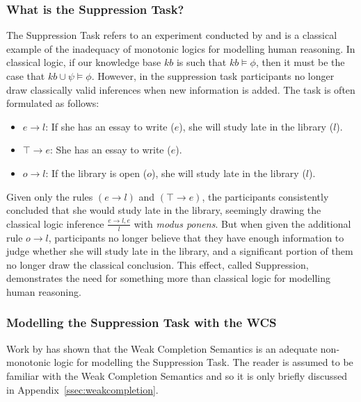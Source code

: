 \documentclass{article}
\begin{document}
\subsubsection{What is the Suppression Task?}
The Suppression Task refers to an experiment conducted by \cite{byrne1989suppressing} and is a classical example of the inadequacy of monotonic logics for modelling human reasoning. In classical logic, if our knowledge base $kb$ is such that $kb \models \phi$, then it must be the case that $kb \cup \psi \models \phi$. However, in the suppression task participants no longer draw classically valid inferences when new information is added. The task is often formulated as follows:

\begin{itemize}
\item $e \rightarrow l$: If she has an essay to write ($e$), she will study late in the library ($l$).
\item $\top \rightarrow e$: She has an essay to write ($e$).
\item $o\rightarrow l$: If the library is open ($o$), she will study late in the library ($l$).
\end{itemize}

Given only the rules $(e \rightarrow l)$ and $(\top \rightarrow e)$, the participants consistently concluded that she would study late in the library, seemingly drawing the classical logic inference $\frac{e \rightarrow l, e}{l}$ with \textit{modus ponens}. But when given the additional rule $o\rightarrow l$, participants no longer believe that they have enough information to judge whether she will study late in the library, and a significant portion of them no longer draw the classical conclusion. This effect, called Suppression, demonstrates the need for something more than classical logic for modelling human reasoning.

\subsubsection{Modelling the Suppression Task with the WCS}
Work by \cite{dietz2014modeling} has shown that the Weak Completion Semantics is an adequate non-monotonic logic for modelling the Suppression Task. The reader is assumed to be familiar with the Weak Completion Semantics and so it is only briefly discussed in Appendix~\ref{ssec:weakcompletion}.
\end{document}
